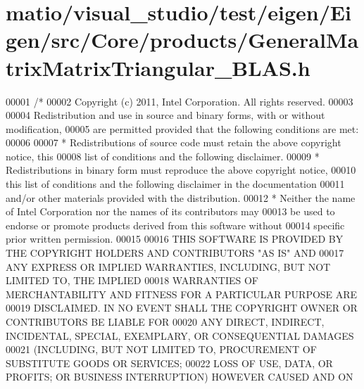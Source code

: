 \hypertarget{matio_2visual__studio_2test_2eigen_2_eigen_2src_2_core_2products_2_general_matrix_matrix_triangular___b_l_a_s_8h_source}{}\section{matio/visual\+\_\+studio/test/eigen/\+Eigen/src/\+Core/products/\+General\+Matrix\+Matrix\+Triangular\+\_\+\+B\+L\+AS.h}
\label{matio_2visual__studio_2test_2eigen_2_eigen_2src_2_core_2products_2_general_matrix_matrix_triangular___b_l_a_s_8h_source}

\begin{DoxyCode}
00001 \textcolor{comment}{/*}
00002 \textcolor{comment}{ Copyright (c) 2011, Intel Corporation. All rights reserved.}
00003 \textcolor{comment}{}
00004 \textcolor{comment}{ Redistribution and use in source and binary forms, with or without modification,}
00005 \textcolor{comment}{ are permitted provided that the following conditions are met:}
00006 \textcolor{comment}{}
00007 \textcolor{comment}{ * Redistributions of source code must retain the above copyright notice, this}
00008 \textcolor{comment}{   list of conditions and the following disclaimer.}
00009 \textcolor{comment}{ * Redistributions in binary form must reproduce the above copyright notice,}
00010 \textcolor{comment}{   this list of conditions and the following disclaimer in the documentation}
00011 \textcolor{comment}{   and/or other materials provided with the distribution.}
00012 \textcolor{comment}{ * Neither the name of Intel Corporation nor the names of its contributors may}
00013 \textcolor{comment}{   be used to endorse or promote products derived from this software without}
00014 \textcolor{comment}{   specific prior written permission.}
00015 \textcolor{comment}{}
00016 \textcolor{comment}{ THIS SOFTWARE IS PROVIDED BY THE COPYRIGHT HOLDERS AND CONTRIBUTORS "AS IS" AND}
00017 \textcolor{comment}{ ANY EXPRESS OR IMPLIED WARRANTIES, INCLUDING, BUT NOT LIMITED TO, THE IMPLIED}
00018 \textcolor{comment}{ WARRANTIES OF MERCHANTABILITY AND FITNESS FOR A PARTICULAR PURPOSE ARE}
00019 \textcolor{comment}{ DISCLAIMED. IN NO EVENT SHALL THE COPYRIGHT OWNER OR CONTRIBUTORS BE LIABLE FOR}
00020 \textcolor{comment}{ ANY DIRECT, INDIRECT, INCIDENTAL, SPECIAL, EXEMPLARY, OR CONSEQUENTIAL DAMAGES}
00021 \textcolor{comment}{ (INCLUDING, BUT NOT LIMITED TO, PROCUREMENT OF SUBSTITUTE GOODS OR SERVICES;}
00022 \textcolor{comment}{ LOSS OF USE, DATA, OR PROFITS; OR BUSINESS INTERRUPTION) HOWEVER CAUSED AND ON}

\end{DoxyCode}
